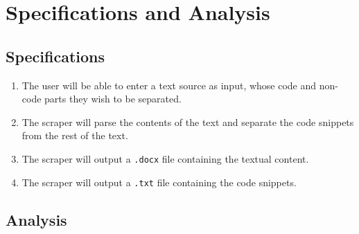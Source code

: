 \documentclass{scrreprt}
\newcommand{\ttt}[1]{\texttt{#1}}
\begin{document}
\chapter{Specifications and Analysis}


\section{Specifications}

\begin{enumerate}
    \item The user will be able to enter a text source as input, whose code and non-code parts they wish to be separated.
    \item The scraper will parse the contents of the text and separate the code snippets from the rest of the text.
    \item The scraper will output a \texttt{.docx} file containing the textual content.
    \item The scraper will output a \ttt{.txt} file containing the code snippets.  
\end{enumerate}



\section{Analysis}
\end{document}
